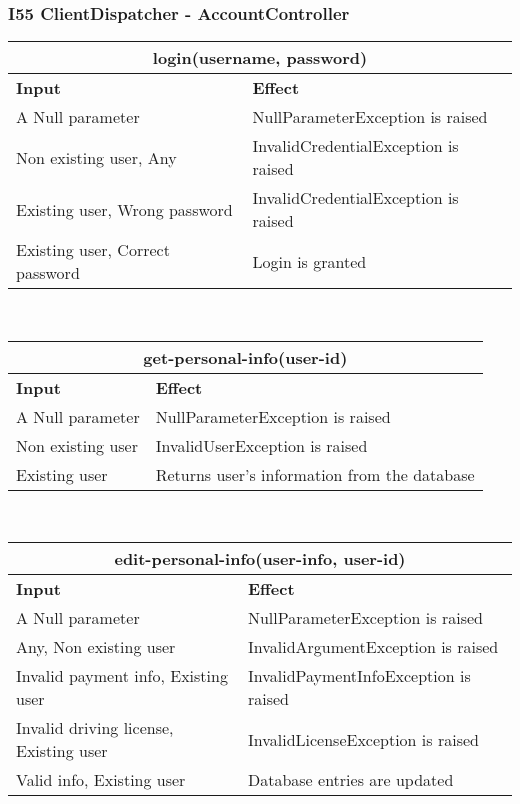 \subsubsection{I55 ClientDispatcher - AccountController}
\begin{tabular}{|p{5cm}|p{7cm}|}
\hline
\multicolumn{2}{|c|}{login(username, password)} \\
\hline
\textbf{Input} & \textbf{Effect} \\

\hline
A Null parameter & NullParameterException is raised \\

\hline
Non existing user, Any & InvalidCredentialException is raised \\

\hline
Existing user, Wrong password & InvalidCredentialException is raised \\

\hline
Existing user, Correct password & Login is granted \\
\hline
\end{tabular}
\\
\begin{tabular}{|p{5cm}|p{7cm}|}
\hline
\multicolumn{2}{|c|}{get-personal-info(user-id)} \\
\hline
\textbf{Input} & \textbf{Effect} \\

\hline
A Null parameter & NullParameterException is raised \\

\hline
Non existing user & InvalidUserException is raised \\

\hline
Existing user & Returns user’s information from the database \\
\hline
\end{tabular}
\\
\begin{tabular}{|p{5cm}|p{7cm}|}
\hline
\multicolumn{2}{|c|}{edit-personal-info(user-info, user-id)} \\
\hline
\textbf{Input} & \textbf{Effect} \\

\hline
A Null parameter & NullParameterException is raised \\

\hline
Any, Non existing user & InvalidArgumentException is raised \\

\hline
Invalid payment info, Existing user & InvalidPaymentInfoException is raised \\

\hline
Invalid driving license, Existing user & InvalidLicenseException is raised \\

\hline
Valid info, Existing user & Database entries are updated \\
\hline
\end{tabular}

